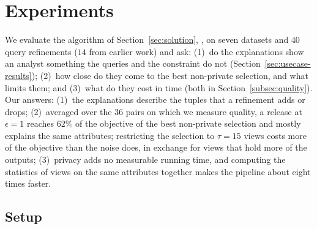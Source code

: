 \section{Experiments}
\label{sec:experiments}

We evaluate the algorithm of Section~\ref{sec:solution}, \sys{}, on seven datasets and $40$ query refinements ($14$ from earlier work) and ask:
(1)~do the explanations show an analyst something the queries and the constraint do not (Section~\ref{sec:usecase-results});
(2)~how close do they come to the best non-private selection, and what limits them; and (3)~what do they cost in time (both in Section~\ref{subsec:quality}).
Our answers:
(1)~the explanations describe the tuples that a refinement adds or drops;
(2)~averaged over the $36$ pairs on which we measure quality, a release at $\epsilon=1$ reaches $62\%$ of the objective of the best non-private selection and mostly explains the same attributes; restricting the selection to $\tau=15$ views costs more of the objective than the noise does, in exchange for views that hold more of the outputs;
(3)~privacy adds no measurable running time, and computing the statistics of views on the same attributes together makes the pipeline about eight times faster.

\subsection{Setup}
\label{subsec:experimental-setup}

